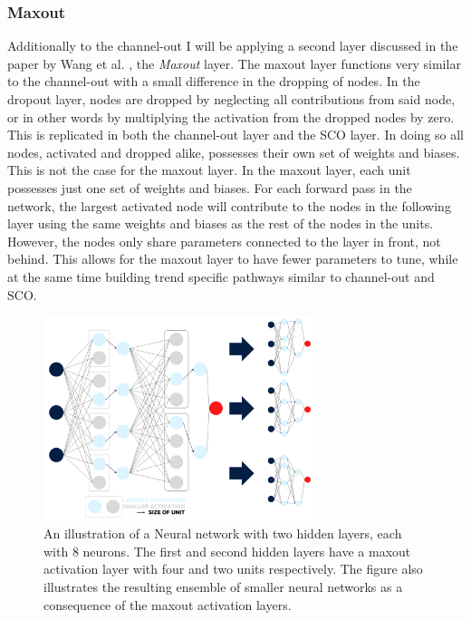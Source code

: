 \subsubsection*{Maxout}\label{subsubsec:maxout} 
Additionally to the channel-out I will be applying a second layer discussed in the paper by Wang et al. \cite{wang_maxout_2013}, 
the \emph{Maxout} layer. The maxout layer functions very similar to the channel-out with a small difference in the dropping of nodes. 
In the dropout layer, nodes are dropped by neglecting all contributions from said node, or in other words by multiplying the activation 
from the dropped nodes by zero. This is replicated in both the channel-out layer and the \ac{SCO} layer. In doing so all nodes, activated 
and dropped alike, possesses their own set of weights and biases. This is not the case for the maxout layer.
In the maxout layer, each unit possesses just one set of weights and biases. For each forward pass in the network, the largest activated 
node will contribute to the nodes in the following layer using the same weights and biases as the rest of the nodes in the units. However, 
the nodes only share parameters connected to the layer in front, not behind. This allows for the maxout layer to have fewer parameters to 
tune, while at the same time building trend specific pathways similar to channel-out and \ac{SCO}. \\
\begin{figure}
    \centering
    \includegraphics[width=0.7\textwidth]{Figures/Illustrations/Max_out.png}
    \caption[An illustration of a Neural network with two hidden layers using the maxout layer.]{An illustration of a Neural network 
    with two hidden layers, each with 8 neurons. The first and second hidden layers have a maxout activation layer with four and two 
    units respectively. The figure also illustrates the resulting ensemble of smaller neural networks as a consequence
    of the maxout activation layers. }
    \label{fig:Max_out}
\end{figure}
